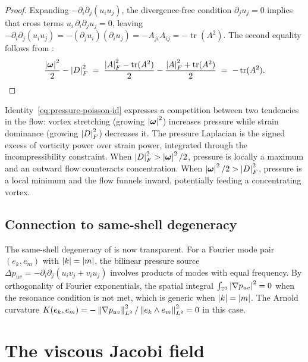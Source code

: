 \begin{proof}
  Expanding $-\partial_i\partial_j(u_i u_j)$, the divergence-free condition
  $\partial_j u_j = 0$ implies that cross terms $u_i\,\partial_i\partial_j u_j = 0$,
  leaving $-\partial_i\partial_j(u_i u_j) = -(\partial_j u_i)(\partial_i u_j)
  = -A_{ji}A_{ij} = -\operatorname{tr}(A^2)$.
  The second equality follows from :
  \[
    \frac{\left\lvert \boldsymbol{\omega} \right\rvert^2}{2} - \left\lvert D \right\rvert^2_F
    \;=\; \frac{\left\lvert A \right\rvert^2_F - \operatorname{tr}(A^2)}{2}
          - \frac{\left\lvert A \right\rvert^2_F + \operatorname{tr}(A^2)}{2}
    \;=\; -\operatorname{tr}(A^2).\qedhere
  \]
\end{proof}

\begin{remark}\label{rem:poisson-geometry}
  Identity~\eqref{eq:pressure-poisson-id} expresses a competition between two tendencies
  in the flow: vortex stretching (growing $\left\lvert \boldsymbol{\omega} \right\rvert^2$) increases pressure while
  strain dominance (growing $\left\lvert D \right\rvert^2_F$) decreases it.  The pressure Laplacian
  is the signed excess of vorticity power over strain power, integrated through the
  incompressibility constraint.  When $\left\lvert D \right\rvert^2_F > \left\lvert \boldsymbol{\omega} \right\rvert^2/2$, pressure is
  locally a maximum and an outward flow counteracts concentration.
  When $\left\lvert \boldsymbol{\omega} \right\rvert^2/2 > \left\lvert D \right\rvert^2_F$, pressure is a local minimum and the flow
  funnels inward, potentially feeding a concentrating vortex.
\end{remark}

\subsection{Connection to same-shell degeneracy}

The same-shell degeneracy of  is now transparent.
For a Fourier mode pair $(e_k, e_m)$ with $\left\lvert k \right\rvert = \left\lvert m \right\rvert$, the bilinear
pressure source $\Delta p_{uv} = -\partial_i\partial_j(u_i v_j + v_i u_j)$
involves products of modes with equal frequency.  By orthogonality of Fourier
exponentials, the spatial integral $\int_{\mathbb{T}^3} \left\lvert \nabla p_{uv} \right\rvert^2 = 0$
when the resonance condition is not met, which is generic when $\left\lvert k \right\rvert = \left\lvert m \right\rvert$.
The Arnold curvature
$K(e_k, e_m) = -\left\lVert \nabla p_{uv} \right\rVert^2_{L^{2}} / \left\lVert e_k \wedge e_m \right\rVert^2_{L^{2}} = 0$
in this case.

\section{The viscous Jacobi field}\label{sec:curv-jacobi}


